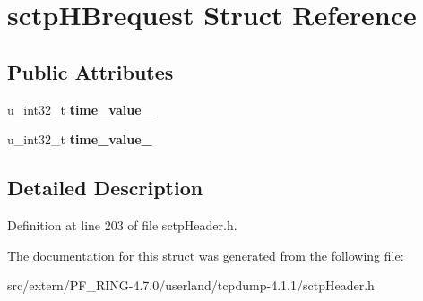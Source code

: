 \hypertarget{structsctp_h_brequest}{
\section{sctpHBrequest Struct Reference}
\label{structsctp_h_brequest}
}
\subsection*{Public Attributes}
\begin{DoxyCompactItemize}
\item 
\hypertarget{structsctp_h_brequest_abe8b72e2746ed594446de6ce21d97bb9}{
u\_\-int32\_\-t {\bfseries time\_\-value\_}}
\label{structsctp_h_brequest_abe8b72e2746ed594446de6ce21d97bb9}

\item 
\hypertarget{structsctp_h_brequest_ac57822f19b951b9fb05fbfc924dfb2cc}{
u\_\-int32\_\-t {\bfseries time\_\-value\_}}
\label{structsctp_h_brequest_ac57822f19b951b9fb05fbfc924dfb2cc}

\end{DoxyCompactItemize}


\subsection{Detailed Description}


Definition at line 203 of file sctpHeader.h.



The documentation for this struct was generated from the following file:\begin{DoxyCompactItemize}
\item 
src/extern/PF\_\-RING-\/4.7.0/userland/tcpdump-\/4.1.1/sctpHeader.h\end{DoxyCompactItemize}
